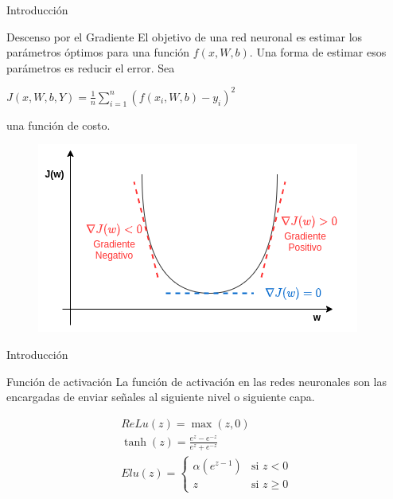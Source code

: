 \documentclass{beamer}
\begin{document}
\begin{frame}{Introducci\'on}

  \begin{block}{Descenso por el Gradiente}
    El objetivo de una red neuronal es estimar los par\'ametros \'optimos para una funci\'on $f(x,W,b)$. Una forma de estimar esos par\'ametros es reducir el error. Sea 

    $J(x,W,b,Y) = \displaystyle\frac{1}{n}\sum\limits_{i=1}^{n}(f(x_i,W,b) - y_i)^2$ 

    una funci\'on de costo.
  \end{block}
  
  \begin{figure}
      \includegraphics[scale=0.4]{funcion_costo}
  \end{figure}

\end{frame}



\begin{frame}{Introducci\'on}

  \begin{block}{Funci\'on de activaci\'on}
    La funci\'on de activaci\'on en las redes neuronales son las encargadas de
    enviar se\~nales al siguiente nivel o siguiente capa.
  \end{block}
  
  \begin{eqnarray}
    ReLu(z) = \max(z,0) 
    \label{Relu} 
    \\
    \tanh(z) = \displaystyle\frac{e^z - e^{-z}}{e^z + e^{-z}} %
    \label{Tanh} 
    \\
    Elu(z)= \begin{cases}
              \alpha(e^{z -1}) & \mbox{si } z < 0\\
              z  &   \mbox{si }z \ge 0
            \end{cases}
  \label{Elu}
  \end{eqnarray}
            

\end{frame}
\end{document}
